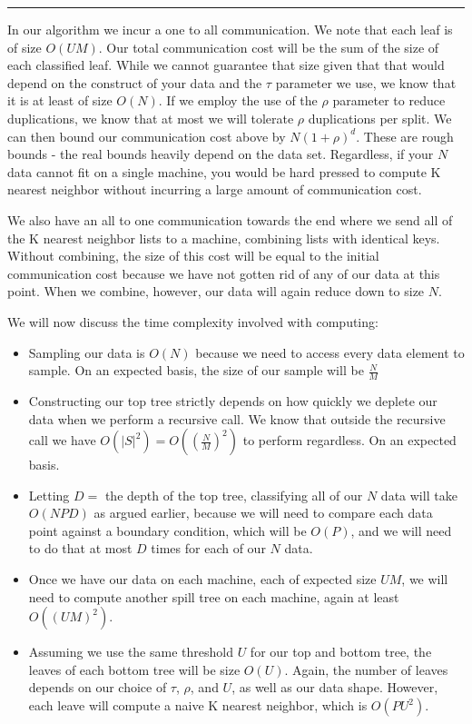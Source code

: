 \noindent\rule{12.1cm}{0.4pt}

\vspace{5 mm}
\noindent
In our algorithm we incur a one to all communication. We note that each leaf 
is of size $O(U M)$. Our total communication cost will be the sum of the size 
of each classified leaf. While we cannot guarantee that size given that that 
would depend on the construct of your data and the $\tau$ parameter we use, we 
know that it is at least of size $O(N)$. If we employ the use of the $\rho$ 
parameter to reduce duplications, we know that at most we will tolerate 
$\rho$ duplications per split. We can then bound our communication cost above 
by $N (1 + \rho)^{d}$. These are rough bounds - the real bounds heavily depend 
on the data set. Regardless, if your $N$ data cannot fit on a single machine, 
you would be hard pressed to compute K nearest neighbor without incurring a 
large amount of communication cost.

\vspace{5 mm}
\noindent
We also have an all to one communication towards the end where we send all of 
the K nearest neighbor lists to a machine, combining lists with identical keys. 
Without combining, the size of this cost will be equal to the initial 
communication cost because we have not gotten rid of any of our data at this 
point. When we combine, however, our data will again reduce down to size $N$.

\vspace{5 mm}
\noindent
We will now discuss the time complexity involved with computing:

\begin{itemize}
\item Sampling our data is $O(N)$ because we need to access every data element 
to sample. On an expected basis, the size of our sample will be $\frac{N}{M}$
\item Constructing our top tree strictly depends on how quickly we deplete our 
data when we perform a recursive call. We know that outside the recursive 
call we have $O(|S|^{2}) = O((\frac{N}{M})^{2})$ to perform regardless. On an 
expected basis.
\item Letting $D = $ the depth of the top tree, classifying all of our $N$ data 
will take $O(N P D)$ as argued earlier, because we will need to compare each 
data point against a boundary condition, which will be $O(P)$, and we will need 
to do that at most $D$ times for each of our $N$ data.
\item Once we have our data on each machine, each of expected size $U M$, we 
will need to compute another spill tree on each machine, again at least 
$O((U M )^{2})$.
\item Assuming we use the same threshold $U$ for our top and bottom tree, the 
leaves of each bottom tree will be size $O(U)$. Again, the number of leaves 
depends on our choice of $\tau$, $\rho$, and $U$, as well as our data shape. 
However, each leave will compute a naive K nearest neighbor, which is 
$O(P U^{2})$.
\end{itemize}

